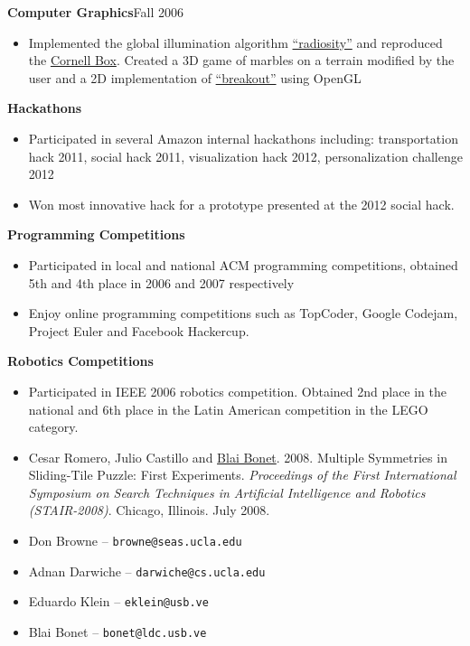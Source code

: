 \documentclass[10pt]{article}
\newcommand{\vitem}{\vspace*{-.4pc}\item}
\begin{document}

\textbf{Computer Graphics}\hfill Fall 2006
\begin{itemize}
 \vitem Implemented the global illumination algorithm
  \href{http://en.wikipedia.org/wiki/Radiosity_\%283D_computer_graphics\%29}{``radiosity''}
  and reproduced the
  \href{http://en.wikipedia.org/wiki/Cornell_box}{Cornell Box}.
  Created a 3D game of marbles on a terrain modified by the user and a
  2D implementation of
  \href{http://en.wikipedia.org/wiki/Breakout_\%28arcade_game\%29}{``breakout''}
  using OpenGL
\end{itemize}

\flushleft{}\textbf{Hackathons}
\begin{itemize}
\vitem Participated in several Amazon internal hackathons including:
transportation hack 2011, social hack 2011, visualization hack 2012,
personalization challenge 2012
\vitem Won most innovative hack for a prototype presented at the 2012
social hack.
\end{itemize}

\flushleft{}\textbf{Programming Competitions}
\begin{itemize}
\vitem Participated in local and national ACM programming competitions, obtained 5th and 4th place in 2006 and 2007 respectively
\vitem Enjoy online programming competitions such as TopCoder, Google
Codejam, Project Euler and Facebook Hackercup.
\end{itemize}

\textbf{Robotics Competitions}
\begin{itemize}
\vitem Participated in IEEE 2006 robotics competition. Obtained 2nd place in the national and 6th place in the Latin American competition in the LEGO category.
\end{itemize}

\begin{itemize}
\vitem Cesar Romero, Julio Castillo and
\href{http://www.ldc.usb.ve/~bonet}{Blai Bonet}. 2008. Multiple
Symmetries in Sliding-Tile Puzzle: First Experiments. \emph{Proceedings of the First International Symposium on Search Techniques in Artificial Intelligence and Robotics (STAIR-2008)}. Chicago, Illinois. July 2008.
\end{itemize}

\begin{itemize}
\vitem Don Browne -- \texttt{browne@seas.ucla.edu}
\vitem Adnan Darwiche -- \texttt{darwiche@cs.ucla.edu}
\vitem Eduardo Klein -- \texttt{eklein@usb.ve}
\vitem Blai Bonet -- \texttt{bonet@ldc.usb.ve}
\end{itemize}
\end{document}
